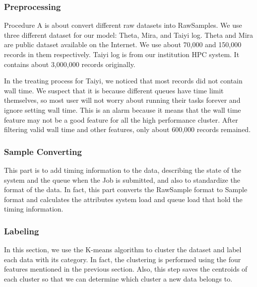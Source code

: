 \documentclass[conference,compsoc]{IEEEtran}
\begin{document}
\subsubsection{Preprocessing}
Procedure A is about convert different raw datasets into RawSamples. We use three different dataset for our model: Theta, Mira, and Taiyi log. Theta and Mira are public dataset available on the Internet. We use about 70,000 and 150,000 records in them respectively. Taiyi log is from our institution HPC system. It contains about 3,000,000 records originally.

In the treating process for Taiyi, we noticed that most records did not contain wall time. We suspect that it is because different queues have time limit themselves, so most user will not worry about running their tasks forever and ignore setting wall time. This is an alarm because it means that the wall time feature may not be a good feature for all the high performance cluster. After filtering valid wall time and other features, only about 600,000 records remained.


\subsubsection{Sample Converting}
This part is to add timing information to the data, describing the state of the system and the queue when the Job is submitted, and also to standardize the format of the data. In fact, this part converts the RawSample format to Sample format and calculates the attributes system load and queue load that hold the timing information.

\subsubsection{Labeling}
In this section, we use the K-means algorithm to cluster the dataset and label each data with its category. In fact, the clustering is performed using the four features mentioned in the previous section. Also, this step saves the centroids of each cluster so that we can determine which cluster a new data belongs to.
\end{document}
